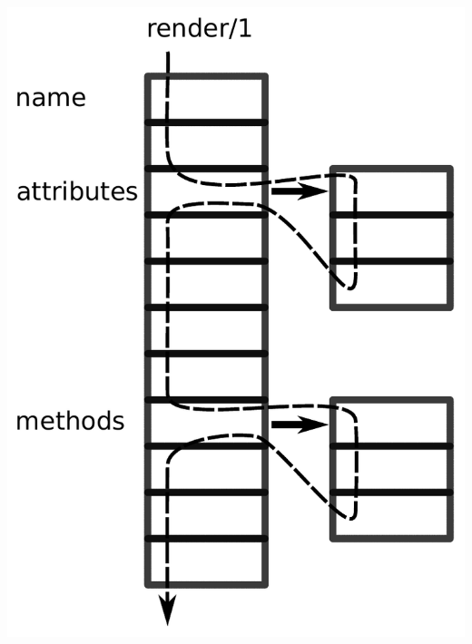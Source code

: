 \documentclass[10pt]{beamer}
\begin{document}
\begin{frame}[fragile]
\begin{columns}
\begin{column}{0.4\linewidth}
      \includegraphics[width=1\linewidth]{code_block_class.pdf}
    \end{column}
  \end{columns}
\end{frame}
\end{document}
